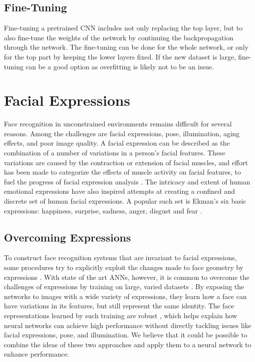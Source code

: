 \subsection{Fine-Tuning}

Fine-tuning a pretrained CNN includes not only replacing the top layer, but to also fine-tune the weights of the network by continuing the backpropagation through the network. The fine-tuning can be done for the whole network, or only for the top part by keeping the lower layers fixed. If the new dataset is large, fine-tuning can be a good option as overfitting is likely not to be an issue. 



\section{Facial Expressions} %

Face recognition in unconstrained environments remains difficult for several reasons. Among the challenges are facial expressions, pose, illumination, aging effects, and poor image quality. A facial expression can be described as the combination of a number of variations in a person's facial features. These variations are caused by the contraction or extension of facial muscles, and effort has been made to categorize the effects of muscle activity on facial features, to fuel the progress of facial expression analysis \cite{exp_db}. The intricacy and extent of human emotional expressions have also inspired attempts at creating a confined and discrete set of human facial expressions. A popular such set is Ekman's six basic expressions: happiness, surprise, sadness, anger, disgust and fear \cite{ekman}.

\subsection{Overcoming Expressions}

To construct face recognition systems that are invariant to facial expressions, some procedures try to explicitly exploit the changes made to face geometry by expressions \cite{exp_inv_1, exp_inv_2, exp_inv_3}. With state of the art ANNs, however, it is common to overcome the challenges of expressions by training on large, varied datasets \cite{facenet, deepface, deepid3}. By exposing the networks to images with a wide variety of expressions, they learn how a face can have variations in its features, but still represent the same identity. The face representations learned by such training are robust \cite{robust}, which helps explain how neural networks can achieve high performance without directly tackling issues like facial expressions, pose, and illumination. We believe that it could be possible to combine the ideas of these two approaches and apply them to a neural network to enhance performance. 


\cleardoublepage